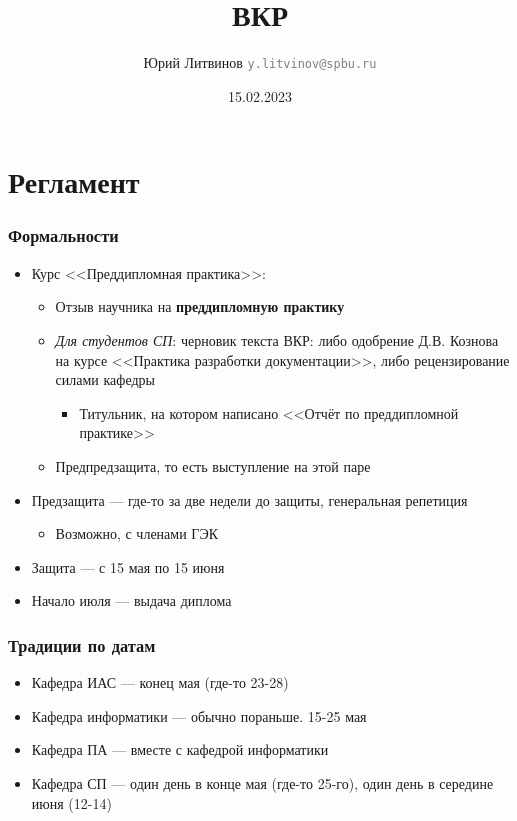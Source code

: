 \documentclass[xetex,mathserif,serif]{beamer}
\title{ВКР}
\author[Юрий Литвинов]{Юрий Литвинов \newline \textcolor{gray}{\small\texttt{y.litvinov@spbu.ru}}}
\date{15.02.2023}
\begin{document}
    \frame{\titlepage}

    \section{Регламент}

    \begin{frame}
        \frametitle{Формальности}
        \begin{itemize}
            \item Курс <<Преддипломная практика>>:
            \begin{itemize}
                \item Отзыв научника на \textbf{преддипломную практику}
                \item \emph{Для студентов СП}: черновик текста ВКР: либо одобрение Д.В. Кознова на курсе <<Практика разработки документации>>, либо рецензирование силами кафедры
                \begin{itemize}
                    \item Титульник, на котором написано <<Отчёт по преддипломной практике>>
                \end{itemize}
                \item Предпредзащита, то есть выступление на этой паре
            \end{itemize}
            \item Предзащита --- где-то за две недели до защиты, генеральная репетиция
            \begin{itemize}
                \item Возможно, с членами ГЭК
            \end{itemize}
            \item Защита --- с 15 мая по 15 июня
            \item Начало июля --- выдача диплома
        \end{itemize}
    \end{frame}

    \begin{frame}
        \frametitle{Традиции по датам}
        \begin{itemize}
            \item Кафедра ИАС --- конец мая (где-то 23-28)
            \item Кафедра информатики --- обычно пораньше. 15-25 мая
            \item Кафедра ПА --- вместе с кафедрой информатики
            \item Кафедра СП --- один день в конце мая (где-то 25-го), один день в середине июня (12-14)
        \end{itemize}
    \end{frame}
\end{document}
